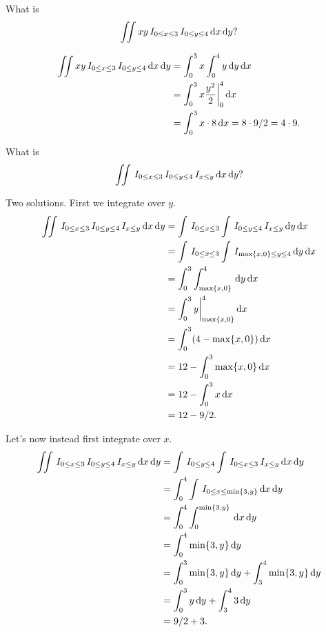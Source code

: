 \begin{exercise}
What is
\begin{equation}
\label{eq:185}
\iint x y \,I_{0\leq x \leq 3}\,I_{0\leq y \leq 4} \,\textrm{d}x \,\textrm{d}y?
\end{equation}
\begin{solution}
\begin{align*}
\iint xy \,I_{0\leq x \leq 3}\,I_{0\leq y \leq 4} \,\textrm{d}x \,\textrm{d}y
&=\int_{0}^{3} x \int_{0}^{4} y \,\textrm{d}y \,\textrm{d}x\\
&=\int_{0}^{3} x \frac{y^{2}} 2 \biggr|_{0}^{4} \,\textrm{d}x\\
&= \int_{0}^{3} x\cdot 8 \,\textrm{d}x = 8\cdot 9/2 = 4\cdot 9.
\end{align*}
\end{solution}
\end{exercise}

\begin{exercise}
What is
\begin{align}
\label{eq:285}
\iint \,I_{0\leq x \leq 3} \,I_{0\leq y \leq 4}\,I_{x\leq y}\,\textrm{d}x \,\textrm{d}y?
\end{align}
\begin{solution}
Two solutions. First we integrate over $y$.
\begin{align}
\label{eq:385}
\iint \,I_{0\leq x \leq 3} \,I_{0\leq y \leq 4}\,I_{x\leq y}\,\textrm{d}x \,\textrm{d}y
&=\int \,I_{0\leq x \leq 3} \int \,I_{0\leq y \leq 4}\,I_{x\leq y}\,\textrm{d}y \,\textrm{d}x\\
&=\int \,I_{0\leq x \leq 3} \int \,I_{\max\{x, 0\} \leq y \leq 4}\,\textrm{d}y \,\textrm{d}x\\
&=\int_{0}^{3} \int_{\max\{x, 0\}}^{4}\,\textrm{d}y \,\textrm{d}x\\
&=\int_{0}^{3} y\biggr|_{\max\{x, 0\}}^{4} \,\textrm{d}x\\
&=\int_{0}^{3}  (4-\max\{x, 0\}) \,\textrm{d}x\\
&=12 - \int_{0}^{3} \max\{x, 0\} \,\textrm{d}x\\
&=12 - \int_{0}^{3} x  \,\textrm{d}x\\
&=12 - 9/2.
\end{align}

Let's now instead first integrate over $x$.
\begin{align}
\label{eq:485}
\iint \,I_{0\leq x \leq 3} \,I_{0\leq y \leq 4}\,I_{x\leq y}\,\textrm{d}x \,\textrm{d}y
&= \int \,I_{0\leq y \leq 4} \int \,I_{0\leq x \leq 3} \,I_{x\leq y}\,\textrm{d}x \,\textrm{d}y\\
&= \int_{0}^{4} \int \,I_{0\leq x \leq \min\{3, y\}}\,\textrm{d}x \,\textrm{d}y\\
&= \int_{0}^{4} \int_{0}^{\min\{3, y\}} \,\textrm{d}x \,\textrm{d}y\\
&= \int_{0}^{4} \min\{3, y\}\,\textrm{d}y\\
&= \int_{0}^{3} \min\{3, y\}\,\textrm{d}y + \int_{3}^{4} \min\{3, y\}\,\textrm{d}y\\
&= \int_{0}^{3} y \,\textrm{d}y + \int_{3}^{4}  3\,\textrm{d}y\\
&= 9/2 + 3.
\end{align}
\end{solution}
\end{exercise}


